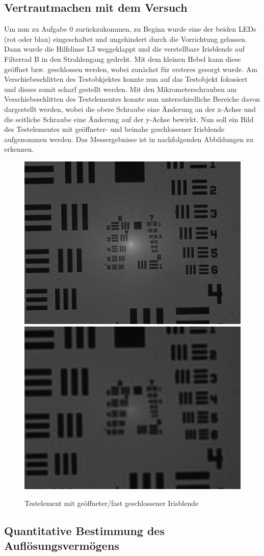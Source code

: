 \documentclass[12pt,a4paper,twoside]{article}
\begin{document}
\subsection{Vertrautmachen mit dem Versuch}

Um nun zu Aufgabe 0 zurückzukommen, zu Beginn wurde eine der beiden LEDs (rot oder blau) eingeschaltet und ungehindert durch die Vorrichtung gelassen. Dann wurde die Hilfslinse L3 weggeklappt und die verstellbare Irisblende auf Filterrad B in den Strahlengang gedreht. 
Mit dem kleinen Hebel kann diese geöffnet bzw. geschlossen werden, wobei zunächst für ersteres gesorgt wurde. Am Verschiebeschlitten des Testobkjektes konnte nun auf das Testobjekt fokusiert und dieses somit scharf gestellt werden. 
Mit den Mikrometerschrauben am Verschiebeschlitten des Testelementes konnte nun unterschiedliche Bereiche davon dargestellt werden, wobei die obere Schraube eine Änderung an der x-Achse und die seitliche Schraube eine Änderung auf der y-Achse bewirkt. 
Nun soll ein Bild des Testelementes mit geöffneter- und beinahe geschlossener Irisblende aufgenommen werden. Das Messergebnisse ist in nachfolgenden Abbildungen zu erkennen.

\begin{figure}[H]
    \centering
    \includegraphics[width=0.4\linewidth]{nudes/AbbeTheorie/Aufgabe 0/scharf-blende-offen.jpg}
    \includegraphics[width=0.4\linewidth]{nudes/AbbeTheorie/Aufgabe 0/scharfgestellt-blende-zu.jpg}
    \caption{Testelement mit geöffneter/fast geschlossener Irisblende}
    \label{fig:Aufgabe0}
\end{figure}


\subsection{Quantitative Bestimmung des Auflösungsvermögens}
\end{document}

